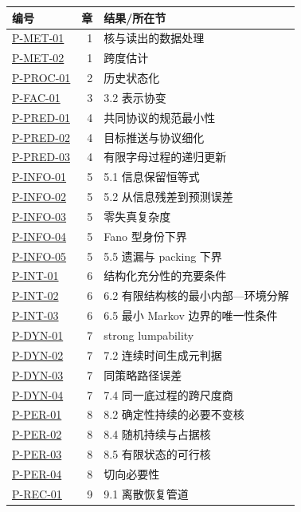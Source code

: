 \documentclass[
  11pt,
  oneside]{book}
\newcounter{none} %
\begin{document}
{\def\LTcaptype{none} %
\begin{longtable}[]{@{}lrl@{}}
\toprule\noalign{}
编号 & 章 & 结果/所在节 \\
\midrule\noalign{}
\endhead
\bottomrule\noalign{}
\endlastfoot
\hyperref[p-met-01]{P-MET-01} & 1 & 核与读出的数据处理 \\
\hyperref[p-met-02]{P-MET-02} & 1 & 跨度估计 \\
\hyperref[p-proc-01]{P-PROC-01} & 2 & 历史状态化 \\
\hyperref[p-fac-01]{P-FAC-01} & 3 & 3.2 表示协变 \\
\hyperref[p-pred-01]{P-PRED-01} & 4 & 共同协议的规范最小性 \\
\hyperref[p-pred-02]{P-PRED-02} & 4 & 目标推送与协议细化 \\
\hyperref[p-pred-03]{P-PRED-03} & 4 & 有限字母过程的递归更新 \\
\hyperref[p-info-01]{P-INFO-01} & 5 & 5.1 信息保留恒等式 \\
\hyperref[p-info-02]{P-INFO-02} & 5 & 5.2 从信息残差到预测误差 \\
\hyperref[p-info-03]{P-INFO-03} & 5 & 零失真复杂度 \\
\hyperref[p-info-04]{P-INFO-04} & 5 & Fano 型身份下界 \\
\hyperref[p-info-05]{P-INFO-05} & 5 & 5.5 遗漏与 packing 下界 \\
\hyperref[p-int-01]{P-INT-01} & 6 & 结构化充分性的充要条件 \\
\hyperref[p-int-02]{P-INT-02} & 6 & 6.2 有限结构核的最小内部---环境分解 \\
\hyperref[p-int-03]{P-INT-03} & 6 & 6.5 最小 Markov 边界的唯一性条件 \\
\hyperref[p-dyn-01]{P-DYN-01} & 7 & strong lumpability \\
\hyperref[p-dyn-02]{P-DYN-02} & 7 & 7.2 连续时间生成元判据 \\
\hyperref[p-dyn-03]{P-DYN-03} & 7 & 同策略路径误差 \\
\hyperref[p-dyn-04]{P-DYN-04} & 7 & 7.4 同一底过程的跨尺度商 \\
\hyperref[p-per-01]{P-PER-01} & 8 & 8.2 确定性持续的必要不变核 \\
\hyperref[p-per-02]{P-PER-02} & 8 & 8.4 随机持续与占据核 \\
\hyperref[p-per-03]{P-PER-03} & 8 & 8.5 有限状态的可行核 \\
\hyperref[p-per-04]{P-PER-04} & 8 & 切向必要性 \\
\hyperref[p-rec-01]{P-REC-01} & 9 & 9.1 离散恢复管道 \\

\end{longtable}}
\end{document}
